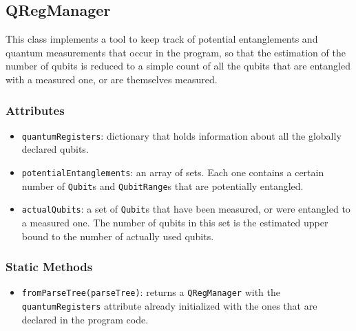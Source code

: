 \documentclass[12pt,a4paper]{report}
\theoremstyle{definition}
\theoremstyle{definition}
\theoremstyle{definition}
\begin{document}
\subsection{QRegManager}
This class implements a tool to keep track of potential entanglements and quantum measurements that occur in the program, so that the estimation of the number of qubits is reduced to a simple count of all the qubits that are entangled with a measured one, or are themselves measured.
\subsubsection{Attributes}
\begin{itemize}
    \itemsep 0em
    \item \texttt{quantumRegisters}: dictionary that holds information about all the globally declared qubits.
    \item \texttt{potentialEntanglements}: an array of sets. Each one contains a certain number of \texttt{Qubit}s and \texttt{QubitRange}s that are potentially entangled.
    \item \texttt{actualQubits}: a set of \texttt{Qubit}s that have been measured, or were entangled to a measured one. The number of qubits in this set is the estimated upper bound to the number of actually used qubits.
\end{itemize}
\subsubsection{Static Methods}
\begin{itemize}
    \itemsep 0em
    \item \texttt{fromParseTree(parseTree)}: returns a \texttt{QRegManager} with the \texttt{quantumRegisters} attribute already initialized with the ones that are declared in the program code.
\end{itemize}
\end{document}
